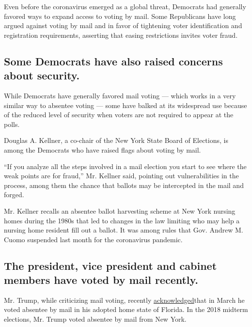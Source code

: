 Even before the coronavirus emerged as a global threat, Democrats had
generally favored ways to expand access to voting by mail. Some
Republicans have long argued against voting by mail and in favor of
tightening voter identification and registration requirements, asserting
that easing restrictions invites voter fraud.

\hypertarget{some-democrats-have-also-raised-concerns-about-security}{%
\subsection{Some Democrats have also raised concerns about
security.}\label{some-democrats-have-also-raised-concerns-about-security}}

While Democrats have generally favored mail voting --- which works in a
very similar way to absentee voting --- some have balked at its
widespread use because of the reduced level of security when voters are
not required to appear at the polls.

Douglas A. Kellner, a co-chair of the New York State Board of Elections,
is among the Democrats who have raised flags about voting by mail.

``If you analyze all the steps involved in a mail election you start to
see where the weak points are for fraud,'' Mr. Kellner said, pointing
out vulnerabilities in the process, among them the chance that ballots
may be intercepted in the mail and forged.

Mr. Kellner recalls an absentee ballot harvesting scheme at New York
nursing homes during the 1980s that led to changes in the law limiting
who may help a nursing home resident fill out a ballot. It was among
rules that Gov. Andrew M. Cuomo suspended last month for the coronavirus
pandemic.

\hypertarget{the-president-vice-president-and-cabinet-members-have-voted-by-mail-recently}{%
\subsection{The president, vice president and cabinet members have voted
by mail
recently.}\label{the-president-vice-president-and-cabinet-members-have-voted-by-mail-recently}}

Mr. Trump, while criticizing mail voting, recently
\href{https://twitter.com/MSNBC/status/1247658663617138691?s=20}{acknowledged}that
in March he voted absentee by mail in his adopted home state of Florida.
In the 2018 midterm elections, Mr. Trump voted absentee by mail from New
York.

